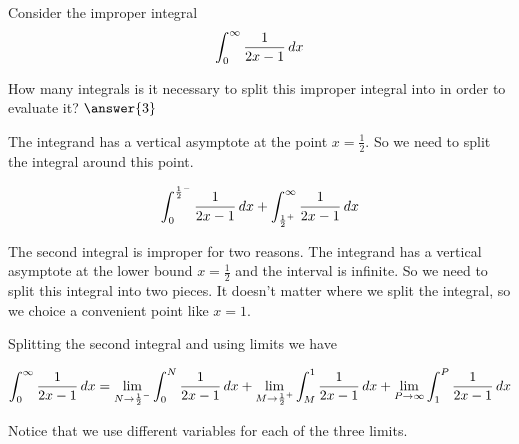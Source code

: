 \documentclass{ximera}
\author{Jason Miller}
\begin{document}
\begin{exercise}
Consider the improper integral 
\[
\int_{0}^{\infty} \frac{1}{2x-1} \mathop{}\!d x
\]

How many integrals is it necessary to split this improper integral into in order to evaluate it? $\answer{3}$


\begin{feedback}[correct]
 The integrand has a vertical asymptote at the point $x=\frac{1}{2}$. So we need to split the integral around this point. 

\[
\int_{0}^{{\frac{1}{2}}^{-}} \frac{1}{2x-1} \mathop{}\!d x + \int_{{\frac{1}{2}}^{+}}^{\infty} \frac{1}{2x-1} \mathop{}\!d x 
\]

The second integral is improper for two reasons. The integrand has a vertical asymptote at the lower bound $x=\frac{1}{2}$ and the interval is infinite. So we need to split this integral into two pieces. It doesn't matter where we split the integral, so we choice a convenient point like $x=1$. 

Splitting the second integral and using limits we have

\[
\int_{0}^{\infty} \frac{1}{2x-1} \mathop{}\!d x= \lim_{N \to {\frac{1}{2}}^{-}} \int_{0}^{N} \frac{1}{2x-1} \mathop{}\!d x +
\lim_{M \to {\frac{1}{2}}^{+}} \int_{M}^{1} \frac{1}{2x-1} \mathop{}\!d x + \lim_{P \to \infty} \int_{1}^{P} \frac{1}{2x-1} \mathop{}\!d x
\]

Notice that we use different variables for each of the three limits.

\end{feedback} 
\end{exercise}
\end{document}
